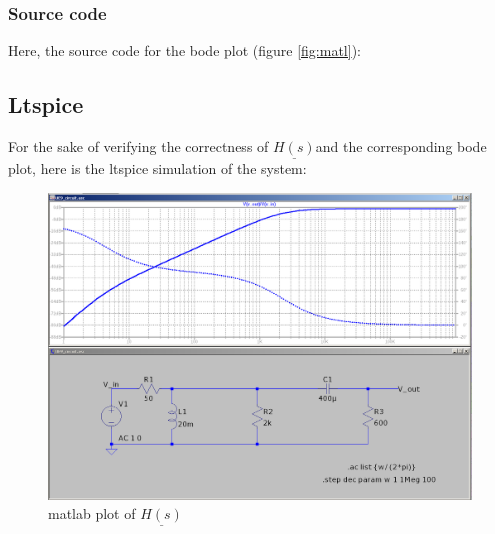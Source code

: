 \documentclass[a4paper]{article}
\begin{document}
\clearpage
\subsubsection{Source code} \label{sec:source}
Here, the source code for the bode plot (figure \ref{fig:matl}):


\clearpage
\subsection{Ltspice}
For the sake of verifying the correctness of $\underline{H(s)}$and 
the corresponding bode plot, here is the ltspice simulation of the system: 

\begin{figure}[ht] \centering
  \includegraphics[scale=0.35]{./Figures/ltspice_sim.png}
  \caption{matlab plot of $\underline{H(s)}$}
  \label{fig:ltspice}
\end{figure}
\end{document}
